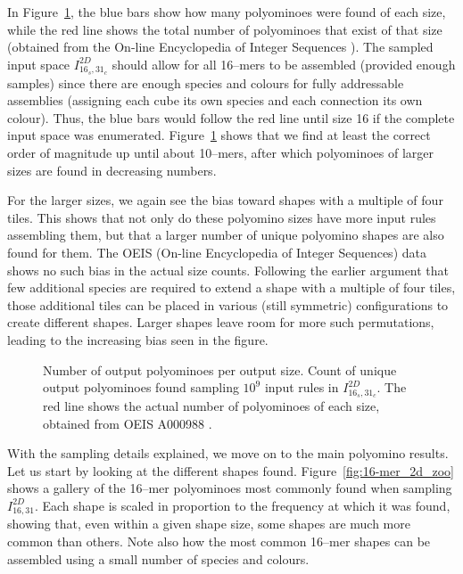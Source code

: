 In Figure~\ref{fig:ref_outputdistr}, the blue bars show how many polyominoes were found of each size, while the red line shows the total number of polyominoes that exist of that size (obtained from the On-line Encyclopedia of Integer Sequences \cite{sloane1995encyclopedia, oeisA000988}). The sampled input space \(I_{16_s,31_c}^{2D}\) should allow for all 16--mers to be assembled (provided enough samples) since there are enough species and colours for fully addressable assemblies (assigning each cube its own species and each connection its own colour). Thus, the blue bars would follow the red line until size 16 if the complete input space was enumerated. Figure~\ref{fig:ref_outputdistr} shows that we find at least the correct order of magnitude up until about 10--mers, after which polyominoes of larger sizes are found in decreasing numbers.


For the larger sizes, we again see the bias toward shapes with a multiple of four tiles. This shows that not only do these polyomino sizes have more input rules assembling them, but that a larger number of unique polyomino shapes are also found for them. The OEIS (On-line Encyclopedia of Integer Sequences) data shows no such bias in the actual size counts. Following the earlier argument that few additional species are required to extend a shape with a multiple of four tiles, those additional tiles can be placed in various (still symmetric) configurations to create different shapes. Larger shapes leave room for more such permutations, leading to the increasing bias seen in the figure.

\begin{figure}[h]
    \centering
    \caption{Number of output polyominoes per output size. Count of unique output polyominoes found sampling \(10^9\) input rules in \(I_{16_s,31_c}^{2D}\). The red line shows the actual number of polyominoes of each size, obtained from OEIS A000988 \cite{sloane1995encyclopedia, oeisA000988}.
    }
    \label{fig:ref_outputdistr}
\end{figure}

With the sampling details explained, we move on to the main polyomino results. Let us start by looking at the different shapes found. Figure~\ref{fig:16-mer_2d_zoo} shows a gallery of the 16--mer polyominoes most commonly found when sampling \(I_{16,31}^{2D}\). Each shape is scaled in proportion to the frequency at which it was found, showing that, even within a given shape size, some shapes are much more common than others. Note also how the most common 16--mer shapes can be assembled using a small number of species and colours.

